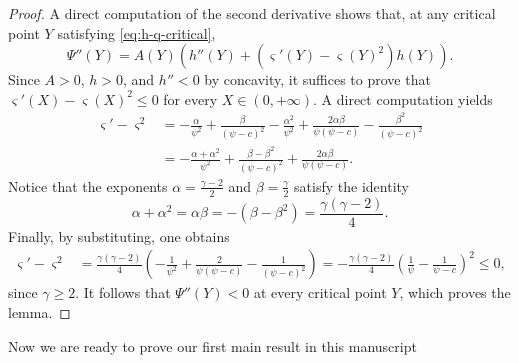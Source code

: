 \documentclass[reqno,11pt]{amsart}
\numberwithin{equation}{section}
\theoremstyle{definition}
\theoremstyle{remark}
\begin{document}
\begin{proof}
A direct computation of the second derivative shows that, at any critical point $Y$ satisfying \eqref{eq:h-q-critical},
\[
\Psi''(Y) = A(Y)\left(h''(Y) + \left(\varsigma'(Y) - \varsigma(Y)^2\right) h(Y)\right).
\]
Since $A > 0$, $h > 0$, and $h'' < 0$ by concavity, it suffices to prove that $\varsigma'(X) - \varsigma(X)^2 \leqslant 0$ for every $X \in (0, +\infty)$. A direct computation yields
\begin{align*}
\varsigma' - \varsigma^2 &= -\frac{\alpha}{\psi^2} + \frac{\beta}{(\psi - c)^2} - \frac{\alpha^2}{\psi^2} + \frac{2\alpha\beta}{\psi(\psi-c)} - \frac{\beta^2}{(\psi-c)^2} \\
&= -\frac{\alpha + \alpha^2}{\psi^2} + \frac{\beta - \beta^2}{(\psi-c)^2} + \frac{2\alpha\beta}{\psi(\psi-c)}.
\end{align*}
Notice that the exponents $\alpha = \tfrac{\gamma-2}{2}$ and $\beta = \tfrac{\gamma}{2}$ satisfy the identity
\[
\alpha + \alpha^2 = \alpha\beta = -(\beta - \beta^2) = \frac{\gamma(\gamma-2)}{4}.
\]
Finally, by substituting, one obtains
\begin{align*}
\varsigma' - \varsigma^2 &= \frac{\gamma(\gamma-2)}{4}\left(-\frac{1}{\psi^2} + \frac{2}{\psi(\psi-c)} - \frac{1}{(\psi-c)^2}\right) = -\frac{\gamma(\gamma-2)}{4}\left(\frac{1}{\psi} - \frac{1}{\psi - c}\right)^2 \leqslant 0,
\end{align*}
since $\gamma \geqslant 2$. It follows that $\Psi''(Y) < 0$ at every critical point $Y$, which proves the lemma.
\end{proof}

Now we are ready to prove our first main result in this manuscript
\end{document}
